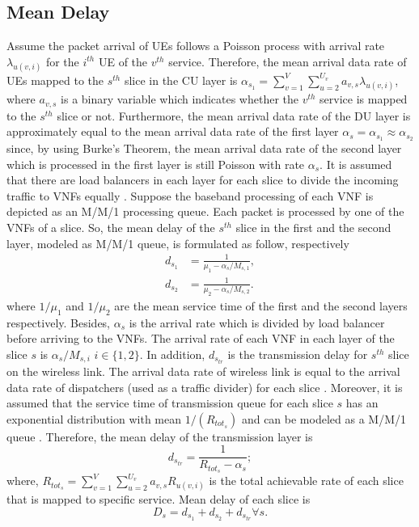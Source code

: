 \documentclass[conference]{IEEEtran}
\begin{document}
\subsection{Mean Delay}

Assume the packet arrival of UEs follows  a Poisson process with arrival rate $\lambda_{u(v,i)}$ for the $i^{th}$ UE of the $v^{th}$ service.
Therefore, the mean arrival data rate of UEs mapped to the $s^{th}$ slice in the CU layer is $\alpha_{s_1} = \sum_{v=1}^{V}\sum_{u=2}^{U_v}a_{v,s}\lambda_{u(v,i)}$, where $a_{v,s}$ is a binary variable which indicates whether the $v^{th}$ service is mapped to the $s^{th}$ slice or not.
Furthermore, the mean arrival data rate of the DU layer is approximately equal to the mean arrival data rate of the first layer $\alpha_{s} =\alpha_{s_1} \approx \alpha_{s_2}$ since, by using Burke’s Theorem, the mean arrival data rate of the second layer which is processed in the first layer is still Poisson with rate $\alpha_{s}$.
It is assumed that there are load balancers in each layer for each slice to divide the incoming traffic to VNFs equally \cite{frdl,luong2018novel,luong2018novel1}.
Suppose the baseband processing of each VNF is depicted as an M/M/1 processing queue.
Each packet is processed by one of the VNFs of a slice. So, the mean delay of the $s^{th}$ slice in the first and the second layer, modeled as M/M/1 queue, is formulated as follow, respectively
\begin{equation}
\begin{split}
d_{s_1} &= \frac{1}{\mu_1 - \alpha_{s}/{M_{s,1}}},\\
d_{s_2} &= \frac{1}{\mu_2 - \alpha_{s}/{M_{s,2}}}.
\end{split}
\end{equation}
where $1/\mu_1$ and $1/\mu_2$ are the mean service time of the first and the second layers respectively.%
Besides, $\alpha_{s}$ is the  arrival rate which is divided
by load balancer before arriving to the VNFs. The  arrival rate of each VNF in each layer of the slice $s$ is $\alpha_{s}/{M_{s,i}}$ $ i \in \{1,2\}$.
In addition, $d_{s_{tr}}$ is the transmission delay for $s^{th}$ slice on the  wireless link. The arrival data rate of wireless link
 is equal to the arrival data rate of dispatchers (used as a traffic divider) for each slice \cite{frdl}.
Moreover, it is assumed that the service time of transmission queue for each slice $s$ has
 an exponential distribution with mean $1/(R_{{tot}_s})$ and can be modeled as a M/M/1 queue \cite{frdl,luong2018novel,luong2018novel1,guo2016exploiting}. Therefore,
the mean delay of the transmission layer is
\begin{equation}
 d_{s_{tr}} = \frac{1}{R_{{tot}_s} - \alpha_{s}};
\end{equation}
where, $R_{{tot}_s} =  \sum_{v=1}^{V}\sum_{u=2}^{U_v}a_{v,s}R_{u(v,i)}$ is the total achievable rate of each slice that is mapped to specific service.
Mean delay of each slice is
\begin{equation}
D_{s} = d_{s_1} + d_{s_2} + d_{s_{tr}} \forall s.
\end{equation}
\end{document}
